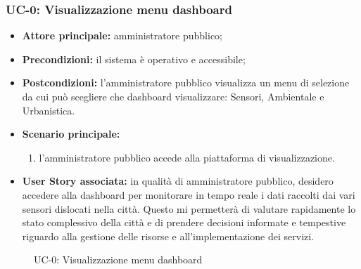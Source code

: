 \documentclass[8pt]{article}
\begin{document}
\subsubsection*{UC-0: Visualizzazione menu dashboard}
\begin{itemize}
    \item \textbf{Attore principale:} amministratore pubblico;
    \item \textbf{Precondizioni:} il sistema è operativo e accessibile;
    \item \textbf{Postcondizioni:} l'amministratore pubblico visualizza un menu di selezione da cui
        può scegliere che dashboard visualizzare: Sensori, Ambientale e Urbanistica.
    \item \textbf{Scenario principale:} 
        \begin{enumerate}
        \item l'amministratore pubblico accede alla piattaforma di visualizzazione.
        \end{enumerate}
    \item \textbf{User Story associata: }in qualità di amministratore pubblico, desidero accedere alla dashboard per monitorare in tempo reale i dati raccolti dai vari sensori dislocati nella città. Questo mi permetterà di valutare rapidamente lo stato complessivo della città e di prendere decisioni informate e tempestive riguardo alla gestione delle risorse e all’implementazione dei servizi.
\end{itemize}

\begin{figure}[ht!]
    \centering
    \caption{UC-0: Visualizzazione menu dashboard}
    \label{fig:UC-0: Visualizzazione menu dashboard}
\end{figure}
\end{document}
